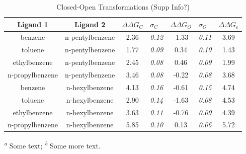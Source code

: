 \documentclass[T4paper.tex]{subfiles}
\begin{document}
\begin{table}[!htb]
\centering
\caption{Closed-Open Transformations (Supp Info?)}
\label{tbl:C-O}
\begin{tabular}{|c|c|c|l|c|l|c|}
\hline
\textbf{Ligand 1}       & \textbf{Ligand 2}    & {\color[HTML]{800080} \boldmath$\Delta\Delta G_{C}$} & {\color[HTML]{800080} \boldmath$\sigma_{C}$} & {\color[HTML]{008000} \boldmath$\Delta\Delta G_{O}$} & {\color[HTML]{008000} \boldmath$\sigma_{O}$} & \boldmath$\Delta\Delta G_{\varepsilon}$ \\ \hline
\cellcolor[HTML]{800080}benzene         & \cellcolor[HTML]{008000}n-pentylbenzene & 2.36                                   & \textit{0.12}                       & -1.33                                & \textit{0.11}                       & \cellcolor[HTML]{FFCCC9}3.69 \\ \hline
\cellcolor[HTML]{800080}toluene         & \cellcolor[HTML]{008000}n-pentylbenzene & 1.77                                   & \textit{0.09}                       & 0.34                                 & \textit{0.10}                       & \cellcolor[HTML]{FFCCC9}1.43 \\ \hline
\cellcolor[HTML]{800080}ethylbenzene    & \cellcolor[HTML]{008000}n-pentylbenzene & 2.45                                   & \textit{0.08}                       & 0.46                                 & \textit{0.09}                       & \cellcolor[HTML]{FFCCC9}1.99 \\ \hline
\cellcolor[HTML]{800080}n-propylbenzene & \cellcolor[HTML]{008000}n-pentylbenzene & 3.46                                   & \textit{0.08}                       & -0.22                                & \textit{0.08}                       & \cellcolor[HTML]{FFCCC9}3.68 \\ \hline
\cellcolor[HTML]{800080}benzene         & \cellcolor[HTML]{008000}n-hexylbenzene  & 4.13                                   & \textit{0.16}                       & -0.61                                & \textit{0.15}                       & \cellcolor[HTML]{FFCCC9}4.74 \\ \hline
\cellcolor[HTML]{800080}toluene         & \cellcolor[HTML]{008000}n-hexylbenzene  & 2.90                                   & \textit{0.14}                       & -1.63                                & \textit{0.08}                       & \cellcolor[HTML]{FFCCC9}4.53 \\ \hline
\cellcolor[HTML]{800080}ethylbenzene    & \cellcolor[HTML]{008000}n-hexylbenzene  & 3.63                                   & \textit{0.11}                       & -0.76                                & \textit{0.09}                       & \cellcolor[HTML]{FFCCC9}4.39 \\ \hline
\cellcolor[HTML]{800080}n-propylbenzene & \cellcolor[HTML]{008000}n-hexylbenzene  & 5.85                                   & \textit{0.10}                       & 0.13                                 & \textit{0.06}                       & \cellcolor[HTML]{FFCCC9}5.72 \\ \hline
\end{tabular}

  \textsuperscript{\emph{a}} Some text;
  \textsuperscript{\emph{b}} Some more text.
\end{table}
\end{document}
